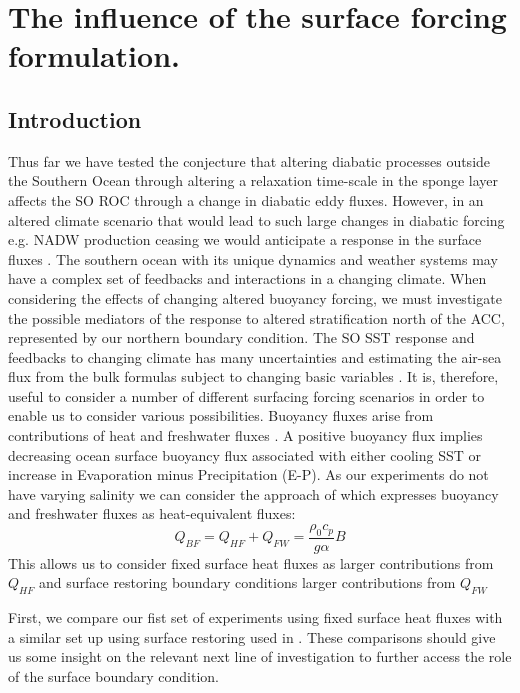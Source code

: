 \label{chap:3}

\section{The influence of the surface forcing formulation.}
\label{sec:Surface1}
\subsection*{Introduction}

Thus far we have tested the conjecture that altering diabatic processes outside the Southern Ocean through altering a relaxation time-scale in the sponge layer affects the SO ROC through a change in diabatic eddy fluxes. However, in an altered climate scenario that would lead to such large changes in diabatic forcing e.g. NADW production ceasing we would anticipate a response in the surface fluxes \citep{Wunsch2004,gnanadesikan1999}. The southern ocean with its unique dynamics and weather systems may have a complex set of feedbacks and interactions in a changing climate. When considering the effects of changing altered buoyancy forcing, we must investigate the possible mediators of the response to altered stratification north of the ACC, represented by our northern boundary condition. The SO \gls{SST} response and feedbacks to changing climate has many uncertainties \citep{Hausmann2016,Ferreira2015} and estimating the air-sea flux from the bulk formulas subject to changing basic variables \citep{cerovecki2011}. It is, therefore, useful to consider a number of different surfacing forcing scenarios in order to enable us to consider various possibilities. Buoyancy fluxes arise from contributions of heat and freshwater fluxes \citep{Gill1982}. A positive buoyancy flux implies decreasing ocean surface buoyancy flux associated with either cooling SST or increase in Evaporation minus Precipitation (E-P). As our experiments do not have varying salinity we can consider the approach of \citet{Moore2002} which expresses buoyancy and freshwater fluxes as heat-equivalent fluxes:
\begin{equation}
Q_{BF} = Q_{HF} + Q_{FW} = \frac{\rho_0 c_p}{g \alpha} B
\end{equation} 
This allows us to consider fixed surface heat fluxes as larger contributions from $Q_{HF}$ and surface restoring boundary conditions larger contributions from $Q_{FW}$

First, we compare our fist set of experiments using fixed surface heat fluxes with a similar set up using surface restoring used in \citet{Abernathey2014}. These comparisons should give us some insight on the relevant next line of investigation to further access the role of the surface boundary condition. 

